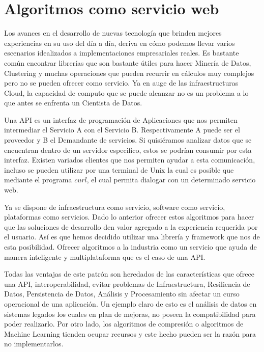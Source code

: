 \section{Algoritmos como servicio web }

	Los avances en el desarrollo de nuevas tecnología que brinden mejores experiencias en su uso del día a día, deriva en cómo podemos llevar varios escenarios idealizados a implementaciones empresariales reales. Es bastante común encontrar librerías que son bastante útiles para hacer Minería de Datos, Clustering y muchas operaciones que pueden recurrir en cálculos muy complejos pero no se pueden ofrecer como servicio. Ya en auge de las infraestructuras Cloud, la capacidad de computo que se puede alcanzar no es un problema a lo que antes se enfrenta un Cientista de Datos.


	Una API es un interfaz de programación de Aplicaciones que nos permiten intermediar el Servicio A con el Servicio B. Respectivamente A puede ser el proveedor y B el Demandante de servicios. Si quisiéramos analizar datos que se encuentran dentro de un servidor especifico, estos se podrían consumir por esta interfaz. Existen variados clientes que nos permiten ayudar a esta comunicación, incluso se pueden utilizar por una terminal de Unix la cual es posible que mediante el programa $curl$, el cual permita dialogar con un determinado servicio web.
	
	Ya se dispone de infraestructura como servicio, software como servicio, plataformas como servicios. Dado lo anterior ofrecer estos algoritmos para hacer que las soluciones de desarrollo den valor agregado a la experiencia requerida por el usuario. Así es que hemos decidido utilizar una librería y framework que nos de esta posibilidad. Ofrecer algoritmos a la industria como un servicio que ayuda de manera inteligente y multiplataforma que es el caso de una API. 
	
	Todas las ventajas de este patrón son heredados de las características que ofrece una API, interoperabilidad, evitar problemas de Infraestructura, Resiliencia de Datos, Persistencia de Datos, Análisis y Procesamiento sin afectar un curso operacional de una aplicación. Un ejemplo claro de esto es el análisis de datos en sistemas legados los cuales en plan de mejoras, no poseen la compatibilidad para poder realizarlo. Por otro lado, los algoritmos de compresión o algoritmos de Machine Learning tienden ocupar recursos y este hecho pueden ser la razón para no implementarlos. 
	
	
	
	